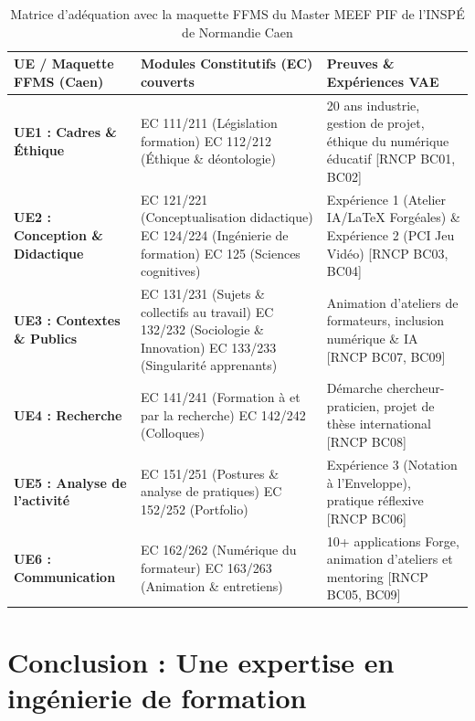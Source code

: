 \begin{table}[htbp]
\centering
\small
\begin{tabular}{|p{4.5cm}|p{6cm}|p{4.5cm}|}
\hline
\textbf{UE / Maquette FFMS (Caen)} & \textbf{Modules Constitutifs (EC) couverts} & \textbf{Preuves \& Expériences VAE} \\
\hline
\textbf{UE1 : Cadres \& Éthique} & EC 111/211 (Législation formation) \newline EC 112/212 (Éthique \& déontologie) & 20 ans industrie, gestion de projet, éthique du numérique éducatif [RNCP BC01, BC02] \\
\hline
\textbf{UE2 : Conception \& Didactique} & EC 121/221 (Conceptualisation didactique) \newline EC 124/224 (Ingénierie de formation) \newline EC 125 (Sciences cognitives) & Expérience 1 (Atelier IA/\LaTeX{} Forgéales) \& Expérience 2 (PCI Jeu Vidéo) [RNCP BC03, BC04] \\
\hline
\textbf{UE3 : Contextes \& Publics} & EC 131/231 (Sujets \& collectifs au travail) \newline EC 132/232 (Sociologie \& Innovation) \newline EC 133/233 (Singularité apprenants) & Animation d'ateliers de formateurs, inclusion numérique \& IA [RNCP BC07, BC09] \\
\hline
\textbf{UE4 : Recherche} & EC 141/241 (Formation à et par la recherche) \newline EC 142/242 (Colloques) & Démarche chercheur-praticien, projet de thèse international [RNCP BC08] \\
\hline
\textbf{UE5 : Analyse de l'activité} & EC 151/251 (Postures \& analyse de pratiques) \newline EC 152/252 (Portfolio) & Expérience 3 (Notation à l'Enveloppe), pratique réflexive [RNCP BC06] \\
\hline
\textbf{UE6 : Communication} & EC 162/262 (Numérique du formateur) \newline EC 163/263 (Animation \& entretiens) & 10+ applications Forge, animation d'ateliers et mentoring [RNCP BC05, BC09] \\
\hline
\end{tabular}
\caption{Matrice d'adéquation avec la maquette FFMS du Master MEEF PIF de l'INSPÉ de Normandie Caen}
\end{table}

\section{Conclusion : Une expertise en ingénierie de formation}


